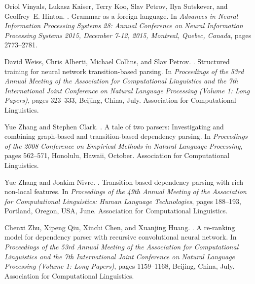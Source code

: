 \documentclass[11pt]{article}
\begin{document}
\begin{thebibliography}{}
Oriol Vinyals, Lukasz Kaiser, Terry Koo, Slav Petrov, Ilya Sutskever, and
  Geoffrey~E. Hinton.
.
\newblock Grammar as a foreign language.
\newblock In {\em Advances in Neural Information Processing Systems 28: Annual
  Conference on Neural Information Processing Systems 2015, December 7-12,
  2015, Montreal, Quebec, Canada}, pages 2773--2781.

David Weiss, Chris Alberti, Michael Collins, and Slav Petrov.
.
\newblock Structured training for neural network transition-based parsing.
\newblock In {\em Proceedings of the 53rd Annual Meeting of the Association for
  Computational Linguistics and the 7th International Joint Conference on
  Natural Language Processing (Volume 1: Long Papers)}, pages 323--333,
  Beijing, China, July. Association for Computational Linguistics.

Yue Zhang and Stephen Clark.
.
\newblock A tale of two parsers: {I}nvestigating and combining graph-based and
  transition-based dependency parsing.
\newblock In {\em Proceedings of the 2008 Conference on Empirical Methods in
  Natural Language Processing}, pages 562--571, Honolulu, Hawaii, October.
  Association for Computational Linguistics.

Yue Zhang and Joakim Nivre.
.
\newblock Transition-based dependency parsing with rich non-local features.
\newblock In {\em Proceedings of the 49th Annual Meeting of the Association for
  Computational Linguistics: Human Language Technologies}, pages 188--193,
  Portland, Oregon, USA, June. Association for Computational Linguistics.

Chenxi Zhu, Xipeng Qiu, Xinchi Chen, and Xuanjing Huang.
.
\newblock A re-ranking model for dependency parser with recursive convolutional
  neural network.
\newblock In {\em Proceedings of the 53rd Annual Meeting of the Association for
  Computational Linguistics and the 7th International Joint Conference on
  Natural Language Processing (Volume 1: Long Papers)}, pages 1159--1168,
  Beijing, China, July. Association for Computational Linguistics.

\end{thebibliography}

\clearpage
\end{document}

